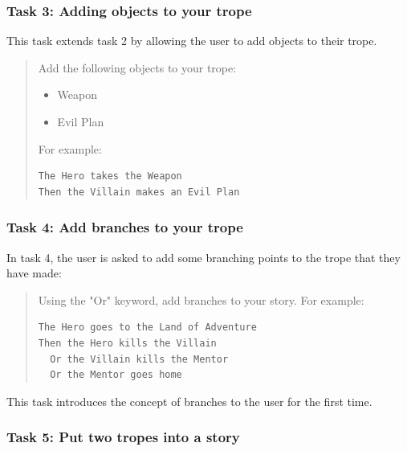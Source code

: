 \documentclass[11pt]{report}
\begin{document}
\subsubsection*{Task 3: Adding objects to your trope}
\label{sec:org9cb2b36}

This task extends task 2 by allowing the user to add objects to their trope.

\begin{framed}
\begin{quote}
Add the following objects to your trope:

\begin{itemize}
\item Weapon
\item Evil Plan
\end{itemize}

For example:

\begin{verbatim}
The Hero takes the Weapon
Then the Villain makes an Evil Plan
\end{verbatim}
\end{quote}
\end{framed}

\subsubsection*{Task 4: Add branches to your trope}
\label{sec:org80c0de6}

In task 4, the user is asked to add some branching points to the trope that they
have made:

\begin{framed}
\begin{quote}
Using the "Or" keyword, add branches to your story. For example:


\begin{verbatim}
The Hero goes to the Land of Adventure
Then the Hero kills the Villain
  Or the Villain kills the Mentor
  Or the Mentor goes home
\end{verbatim}
\end{quote}
\end{framed}

This task introduces the concept of branches to the user for the first time.

\subsubsection*{Task 5: Put two tropes into a story}
\label{sec:orga5afeae}
\end{document}
